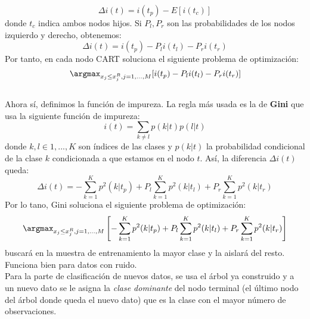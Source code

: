 \[ \Delta i(t) = i(t_{p})-E[i(t_{c})] \]
donde $t_{c}$ indica ambos nodos hijos. Si $P_{l},P_{r}$ son las probabilidades de los nodos izquierdo y derecho, obtenemos:
\[ \Delta i(t)= i(t_{p}) - P_{l} i(t_{l}) - P_{r} i(t_{r}) \]
Por tanto, en cada nodo CART soluciona el siguiente problema de optimización:
\[ \argmax_{x_{j} \leq x_{j}^{R},j=1,...,M}[i(t_{p}) - P_{l} i(t_{l}) - P_{r} i(t_{r})] \]
\cite{timofeev2004classification}\\
Ahora sí, definimos la función de impureza. La regla más usada es la de \textbf{Gini} que usa la siguiente función de impureza:
\[ i(t) = \sum_{k \neq l} p(k \vert t)p(l \vert t) \]
donde $k,l \in {1,...,K}$ son índices de las clases y $p(k \vert t)$ la probabilidad condicional de la clase $k$ condicionada a que estamos en el nodo $t$. Así, la diferencia $\Delta i(t)$ queda:
\[ \Delta i(t) = -\sum_{k=1}^{K} p^{2}(k \vert t_{p}) + P_{l} \sum_{k=1}^{K} p^{2}(k \vert t_{l}) + P_{r} \sum_{k=1}^{K}p^{2}(k \vert t_{r}) \]
Por lo tano, Gini soluciona el siguiente problema de optimización:
\[ \argmax_{x_{j} \leq x_{j}^{R},j=1,...,M} \left[ -\sum_{k=1}^{K} p^{2}(k \vert t_{p}) + P_{l} \sum_{k=1}^{K} p^{2}(k \vert t_{l}) + P_{r} \sum_{k=1}^{K}p^{2}(k \vert t_{r}) \right] \]
buscará en la muestra de entrenamiento la mayor clase y la aislará del resto. Funciona bien para datos con ruido.\\
Para la parte de clasificación de nuevos datos, se usa el árbol ya construido y a un nuevo dato se le asigna la \textit{clase dominante} del nodo terminal (el último nodo del árbol donde queda el nuevo dato) que es la clase con el mayor número de observaciones.\cite{timofeev2004classification}\\

